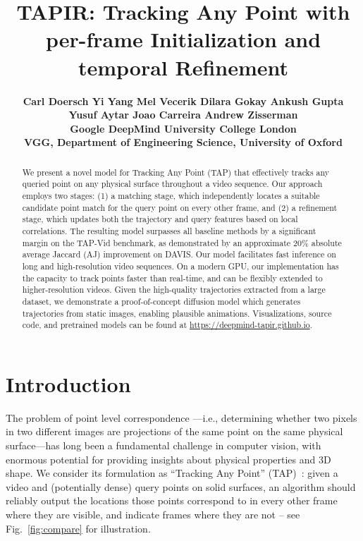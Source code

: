 \documentclass[10pt,twocolumn,letterpaper]{article}
\begin{document}
\title{TAPIR: Tracking Any Point with per-frame Initialization and temporal Refinement}

\author{
   \bf Carl Doersch \qquad Yi Yang \qquad Mel Vecerik \qquad Dilara Gokay \qquad Ankush Gupta \\
   \bf Yusuf Aytar \qquad Joao Carreira \qquad Andrew Zisserman \\
    Google DeepMind \qquad  University College London \\
    VGG, Department of Engineering Science, University of Oxford
}

\maketitle
\ificcvfinal\thispagestyle{empty}\fi

\begin{abstract}
We present a novel model for Tracking Any Point (TAP) that effectively tracks any queried point on any physical surface throughout a video sequence. Our approach employs two stages: (1) a matching stage, which independently locates a suitable candidate point match for the query point on every other frame, and (2) a refinement stage, which updates both the trajectory and query features based on local correlations. The resulting model surpasses all baseline methods by a significant margin on the TAP-Vid benchmark, as demonstrated by an approximate 20\% absolute average Jaccard (AJ) improvement on DAVIS. Our model facilitates fast inference on long and high-resolution video sequences.  On a modern GPU, our implementation has the capacity to track points faster than real-time, and can be flexibly extended to higher-resolution videos.
Given the high-quality trajectories extracted from a large dataset, we demonstrate a proof-of-concept diffusion model which generates trajectories from static images, enabling plausible animations.
Visualizations, source code, and pretrained models can be found at \url{https://deepmind-tapir.github.io}. \end{abstract}

\section{Introduction}

The problem of point level correspondence ---i.e., determining whether two pixels in two different images are projections of the same point on the same physical surface---has long been a fundamental challenge in computer vision, with enormous potential for providing insights about physical properties and 3D shape. We consider its formulation as  ``Tracking Any Point'' (TAP)~\cite{doersch2022tap}: given a video and (potentially dense) query points on solid surfaces, an algorithm should reliably output the locations those points correspond to in every other frame where they are visible, and indicate frames where they are not -- see Fig.~\ref{fig:compare} for illustration.
\end{document}
